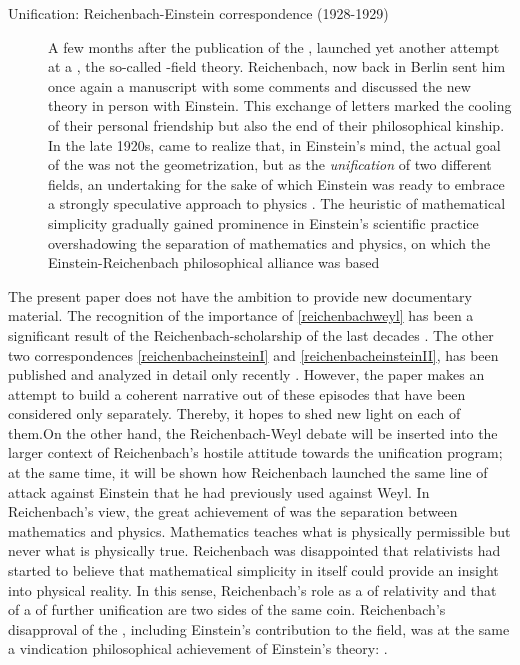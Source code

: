 \documentclass[draft]{article}
\newcommand{\PRZL}{\citetitle{Reichenbach1928}\xspace}
\newcommand{\FP}{\german{Fernparallelismus}\xspace}
\begin{document}
\begin{description}
\item[Unification: Reichenbach-Einstein correspondence (1928-1929)]\label{reichenbacheinsteinII}  A few months after the publication of the \PRZL \citep{Reichenbach1928}, \citet{Einstein19281,Einstein19282} launched yet another attempt at a \uft, the so-called \FP-field theory. Reichenbach, now back in Berlin sent him once again a manuscript with some comments \citep{Reichenbach1928b} and discussed the new theory in person with Einstein. This exchange of letters marked the cooling of their personal friendship but also the end of their philosophical kinship. In the late 1920s, \citet{Reichenbach1929a,Reichenbach1929b,Reichenbach1929c} came to realize that, in Einstein's mind, the actual goal of the \uftp was not the geometrization, but as the \emph{unification} of two different fields, an undertaking for the sake of which Einstein was ready to embrace a strongly speculative approach to physics \citep{Dongen2010}.  The heuristic of mathematical simplicity gradually gained prominence in Einstein's scientific practice overshadowing the separation of mathematics and physics, on which the Einstein-Reichenbach philosophical alliance was based
\end{description}
%
The present paper does not have the ambition to provide new documentary material. The recognition of the importance of \cref{reichenbachweyl} has been a significant result of the Reichenbach-scholarship of the last decades \citep{Ryckman1995,Ryckman1996}. The other two correspondences \cref{reichenbacheinsteinI} and \cref{reichenbacheinsteinII}, has been published and analyzed in detail only recently \citep{Giovanelli2016d,Giovanelli2022}. However, the paper makes an attempt to build a coherent narrative out of these episodes that have been considered only separately. Thereby, it hopes to shed new light on each of them.On the other hand, the Reichenbach-Weyl debate will be inserted into the larger context of Reichenbach's hostile attitude towards the unification program; at the same time, it will be shown how Reichenbach launched the same line of attack against Einstein that he had previously used against Weyl. In Reichenbach's view, the great achievement of \gr was the separation between mathematics and physics. Mathematics teaches what is physically permissible but never what is physically true. Reichenbach was disappointed that relativists had started to believe that mathematical simplicity in itself could provide an insight into physical reality. In this sense, Reichenbach's role as a  of relativity and that of a  of further unification are two sides of the same coin. Reichenbach's disapproval of the \uftp, including Einstein's contribution to the field, was at the same a vindication philosophical achievement of Einstein's theory:  \citep[11]{Reichenbach1929}.  
\end{document}

